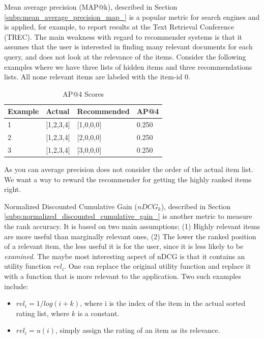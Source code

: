 

Mean average precision (MAP@k), described in Section \ref{subp:mean_average_precision_map_} is a popular metric for search engines and is applied, for example, to report results at the Text Retrieval Conference (TREC). The main weakness with regard to recommender systems is that it assumes that the user is interested in finding many relevant documents for each query, and does not look at the relevance of the items. Consider the following examples where we have three lists of hidden items and three recommendations lists. All none relevant items are labeled with the item-id $0$.

\begin{table}[H]
\label{table:ap}
\centering
\begin{tabular}{*{4}l}
\toprule
Example 	& 	Actual	& 	Recommended		&	AP@4   \\ \midrule
1			& [1,2,3,4]	&	[1,0,0,0]		&	0.250  \\ 
2			& [1,2,3,4]	&	[2,0,0,0]		&	0.250  \\ 
3			& [1,2,3,4]	&	[3,0,0,0]		&	0.250  \\
\bottomrule
\end{tabular}
\caption{AP@4 Scores}
\end{table}

As you can average precision does not consider the order of the actual item list. We want a way to
reward the recommender for getting the highly ranked items right.

Normalized Discounted Cumulative Gain ($nDCG_{k}$), described in Section \ref{subp:normalized_discounted_cumulative_gain_}
is another metric to measure the rank accuracy. It is based on two main assumptions; (1) Highly relevant items are more useful than marginally relevant ones, (2) The lower the ranked position of a relevant item, the less useful it is for the user, since it is less likely to be \emph{examined}. The maybe most interesting aspect of nDCG is that it contains an utility function $rel_i$. One can replace the original utility function and replace it with a function that is more relevant to the application. Two such examples include:

\begin{itemize}
\item $rel_i = 1/log(i+k)$, where i is the index of the item in the actual sorted rating list, where $k$ is a constant.
\item $rel_i = u(i)$, simply assign the rating of an item as its relevance.
\end{itemize}

